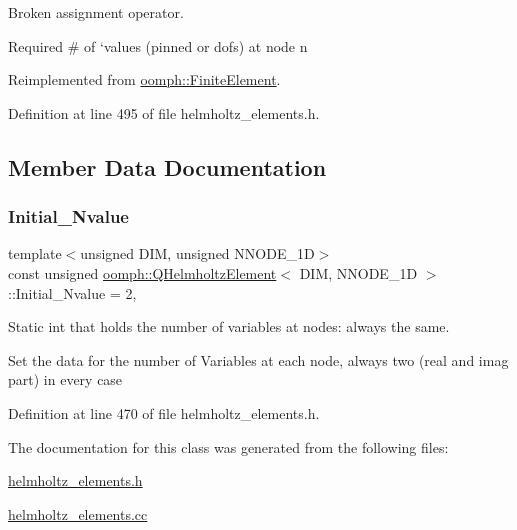Broken assignment operator. 

Required \# of `values\textquotesingle{} (pinned or dofs) at node n 

Reimplemented from \hyperlink{classoomph_1_1FiniteElement_a56610c60d5bc2d7c27407a1455471b1a}{oomph\+::\+Finite\+Element}.



Definition at line 495 of file helmholtz\+\_\+elements.\+h.



\subsection{Member Data Documentation}
\mbox{\label{classoomph_1_1QHelmholtzElement_a37a84fca1e6a286a866ba74689998a17}} 
\subsubsection{\texorpdfstring{Initial\+\_\+\+Nvalue}{Initial\_Nvalue}}
{\footnotesize\ttfamily template$<$unsigned D\+IM, unsigned N\+N\+O\+D\+E\+\_\+1D$>$ \\
const unsigned \hyperlink{classoomph_1_1QHelmholtzElement}{oomph\+::\+Q\+Helmholtz\+Element}$<$ D\+IM, N\+N\+O\+D\+E\+\_\+1D $>$\+::Initial\+\_\+\+Nvalue = 2\hspace{0.3cm}{\ttfamily [static]}, {\ttfamily [private]}}



Static int that holds the number of variables at nodes\+: always the same. 

Set the data for the number of Variables at each node, always two (real and imag part) in every case 

Definition at line 470 of file helmholtz\+\_\+elements.\+h.



The documentation for this class was generated from the following files\+:\begin{DoxyCompactItemize}
\item 
\hyperlink{helmholtz__elements_8h}{helmholtz\+\_\+elements.\+h}\item 
\hyperlink{helmholtz__elements_8cc}{helmholtz\+\_\+elements.\+cc}\end{DoxyCompactItemize}
